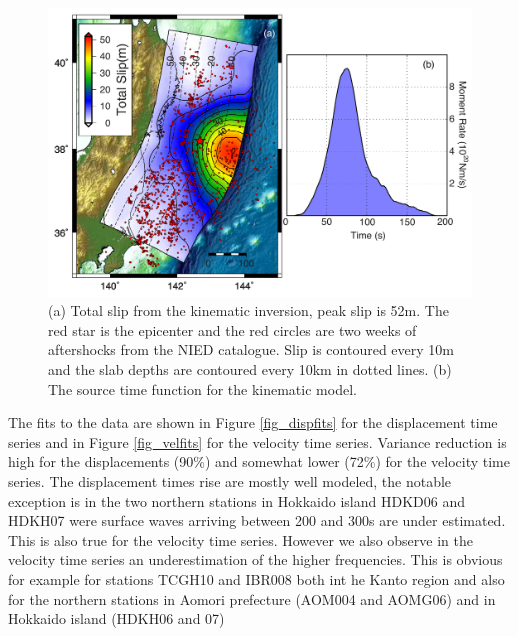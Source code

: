 \begin{figure}[!ht] 
  \centering
  \includegraphics[width=0.99\linewidth]{./figures/ch4/total_slip_moment_rate.pdf}
    \caption[Kinematic inversion results]{(a) Total slip from the kinematic inversion, peak slip is 52m. The red star is the epicenter and the red circles are two weeks of aftershocks from the NIED catalogue. Slip is contoured every 10m and the slab depths are contoured every 10km in dotted lines. (b) The source time function for the kinematic model. }
  \label{fig_totalslip}
\end{figure}

The fits to the data are shown in Figure \ref{fig_dispfits} for the displacement time series and in Figure \ref{fig_velfits} for the velocity time series. Variance reduction is high for the displacements (90\%) and somewhat lower (72\%) for the velocity time series.  The displacement times rise are mostly well modeled, the notable exception is in the two northern stations in Hokkaido island HDKD06 and HDKH07 were surface waves arriving between 200 and 300s are under estimated. This is also true for the velocity time series. However we also observe in the velocity time series an underestimation of the higher frequencies. This is obvious for example for stations TCGH10 and IBR008 both int he Kanto region and also for the northern stations in Aomori prefecture (AOM004 and AOMG06) and in Hokkaido island (HDKH06 and 07)

